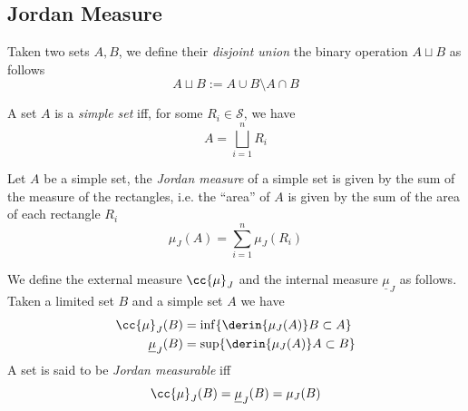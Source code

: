 \documentclass[../mmf.tex]{subfiles}
\begin{document}
\subsection{Jordan Measure}
\begin{dfn}
	Taken two sets $A,B$, we define their \textit{disjoint union} the binary operation $A\sqcup B$ as follows
	\begin{equation}
		A\sqcup B:=A\cup B\setminus A\cap B
		\label{eq:disjointunion}
	\end{equation}
\end{dfn}
\begin{dfn}
	A set $A$ is a \textit{simple set} iff, for some $R_i\in\mathcal{S}$, we have
	\begin{equation*}
		A=\bigsqcup_{i=1}^nR_i
	\end{equation*}
\end{dfn}
\begin{dfn}
	Let $A$ be a simple set, the \textit{Jordan measure} of a simple set is given by the sum of the measure of the rectangles, i.e. the ``area'' of $A$ is given by the sum of the area of each rectangle $R_i$
	\begin{equation}
		\mu_J(A)=\sum_{i=1}^n\mu_J(R_i)
		\label{eq:simplesetmeas}
	\end{equation}
\end{dfn}
\begin{dfn}
	We define the external measure $\cc{\mu}_J$ and the internal measure $\underline{\mu}_J$ as follows.\\
	Taken a limited set $B$ and a simple set $A$ we have
	\begin{equation}
		\begin{aligned}
			\cc{\mu}_J(B)&=\inf\{\derin{\mu_J(A)}B\subset A\}\\
			\underline{\mu}_J(B)&=\sup\{\derin{\mu_J(A)}A\subset B\}
		\end{aligned}
		\label{eq:extintmeas}
	\end{equation}
	A set is said to be \textit{Jordan measurable} iff
	\begin{equation*}
		\cc{\mu}_J(B)=\underline{\mu}_J(B)=\mu_J(B)
	\end{equation*}
\end{dfn}
\end{document}
